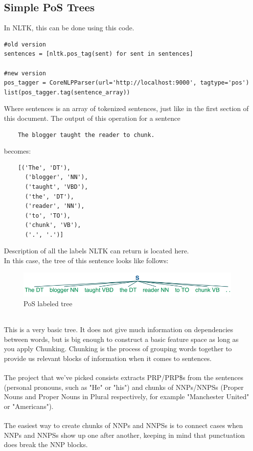\documentclass{article}
\begin{document}
\subsection{Simple PoS Trees}
In NLTK, this can be done using this code.
\begin{verbatim}
#old version
sentences = [nltk.pos_tag(sent) for sent in sentences]

#new version
pos_tagger = CoreNLPParser(url='http://localhost:9000', tagtype='pos')
list(pos_tagger.tag(sentence_array))
\end{verbatim}
Where sentences is an array of tokenized sentences, just like in the first section of this document. The output of this operation for a sentence
\begin{verbatim}
    The blogger taught the reader to chunk.
\end{verbatim}
becomes:
\begin{verbatim}
    [('The', 'DT'),
      ('blogger', 'NN'),
      ('taught', 'VBD'),
      ('the', 'DT'),
      ('reader', 'NN'),
      ('to', 'TO'),
      ('chunk', 'VB'),
      ('.', '.')]
\end{verbatim}
Description of all the labels NLTK can return is located here\cite{POS labels}. \\
In this case, the tree of this sentence looks like follows:
\begin{figure}[htb!]
    \centering
    \includegraphics[width=\textwidth]{nickcdryanblog2.png}
    \caption{PoS labeled tree}
\end{figure}\\
This is a very basic tree. It does not give much information on dependencies between words, but is big enough to construct a basic feature space as long as you apply Chunking. Chunking is the process of grouping words together to provide us relevant blocks of information when it comes to sentences. \\ \\
The project that we've picked consists extracts PRP/PRP\$s from the sentences (personal pronouns, such as "He" or "his") and chunks of NNPs/NNPSs (Proper Nouns and Proper Nouns in Plural respectively, for example "Manchester United" or "Americans"). \\ \\
The easiest way to create chunks of NNPs and NNPSs is to connect cases when NNPs and NNPSs show up one after another, keeping in mind that punctuation does break the NNP blocks.
\end{document}
